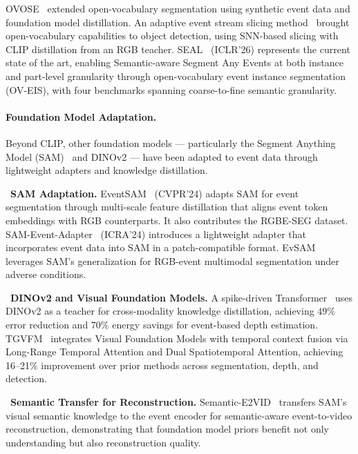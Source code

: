 OVOSE~\cite{bendali2024ovose} extended open-vocabulary segmentation using synthetic event data and foundation model distillation. An adaptive event stream slicing method~\cite{li2025ovdetection} brought open-vocabulary capabilities to object detection, using SNN-based slicing with CLIP distillation from an RGB teacher. SEAL~\cite{li2026seal} (ICLR'26) represents the current state of the art, enabling Semantic-aware Segment Any Events at both instance and part-level granularity through open-vocabulary event instance segmentation (OV-EIS), with four benchmarks spanning coarse-to-fine semantic granularity.

\paragraph{Foundation Model Adaptation.}
Beyond CLIP, other foundation models --- particularly the Segment Anything Model (SAM)~\cite{kirillov2023sam} and DINOv2 --- have been adapted to event data through lightweight adapters and knowledge distillation.

\noindent{}~\textbf{SAM Adaptation.} EventSAM~\cite{chen2024eventsam} (CVPR'24) adapts SAM for event segmentation through multi-scale feature distillation that aligns event token embeddings with RGB counterparts. It also contributes the RGBE-SEG dataset. SAM-Event-Adapter~\cite{zhou2024sameventadapter} (ICRA'24) introduces a lightweight adapter that incorporates event data into SAM in a patch-compatible format. EvSAM~\cite{hu2025evsam} leverages SAM's generalization for RGB-event multimodal segmentation under adverse conditions.

\noindent{}~\textbf{DINOv2 and Visual Foundation Models.} A spike-driven Transformer~\cite{liu2024spikedinov2} uses DINOv2 as a teacher for cross-modality knowledge distillation, achieving 49\% error reduction and 70\% energy savings for event-based depth estimation. TGVFM~\cite{zhang2025tgvfm} integrates Visual Foundation Models with temporal context fusion via Long-Range Temporal Attention and Dual Spatiotemporal Attention, achieving 16--21\% improvement over prior methods across segmentation, depth, and detection.

\noindent{}~\textbf{Semantic Transfer for Reconstruction.} Semantic-E2VID~\cite{wu2025semantice2vid} transfers SAM's visual semantic knowledge to the event encoder for semantic-aware event-to-video reconstruction, demonstrating that foundation model priors benefit not only understanding but also reconstruction quality.


